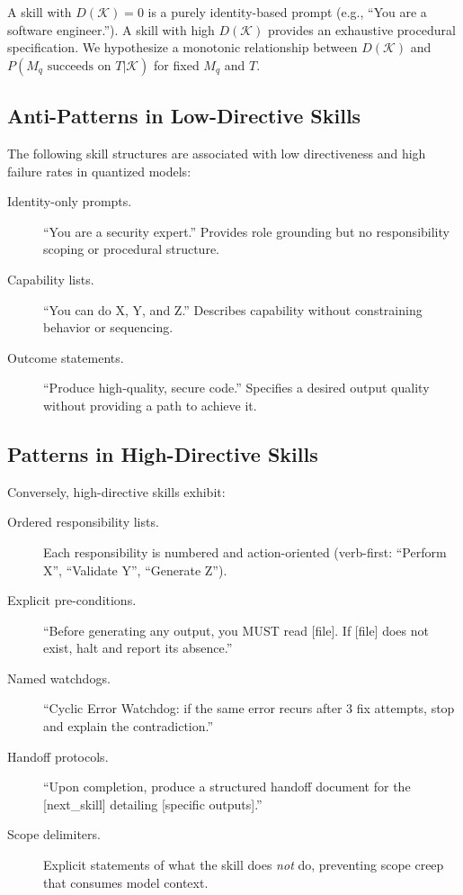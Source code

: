 \documentclass[11pt,a4paper]{article}
\begin{document}
A skill with $D(\mathcal{K}) = 0$ is a purely identity-based prompt (e.g.,
``You are a software engineer.''). A skill with high $D(\mathcal{K})$
provides an exhaustive procedural specification. We hypothesize a monotonic
relationship between $D(\mathcal{K})$ and $P(M_q \text{ succeeds on }
T | \mathcal{K})$ for fixed $M_q$ and $T$.

\subsection{Anti-Patterns in Low-Directive Skills}

The following skill structures are associated with low directiveness and
high failure rates in quantized models:

\begin{description}
  \item[Identity-only prompts.] ``You are a security expert.'' Provides role
    grounding but no responsibility scoping or procedural structure.
  \item[Capability lists.] ``You can do X, Y, and Z.'' Describes capability
    without constraining behavior or sequencing.
  \item[Outcome statements.] ``Produce high-quality, secure code.'' Specifies
    a desired output quality without providing a path to achieve it.
\end{description}

\subsection{Patterns in High-Directive Skills}

Conversely, high-directive skills exhibit:

\begin{description}
  \item[Ordered responsibility lists.] Each responsibility is numbered and
    action-oriented (verb-first: ``Perform X'', ``Validate Y'', ``Generate Z'').
  \item[Explicit pre-conditions.] ``Before generating any output, you MUST
    read [file]. If [file] does not exist, halt and report its absence.''
  \item[Named watchdogs.] ``Cyclic Error Watchdog: if the same error recurs
    after 3 fix attempts, stop and explain the contradiction.''
  \item[Handoff protocols.] ``Upon completion, produce a structured handoff
    document for the [next\_skill] detailing [specific outputs].''
  \item[Scope delimiters.] Explicit statements of what the skill does
    \emph{not} do, preventing scope creep that consumes model context.
\end{description}
\end{document}
